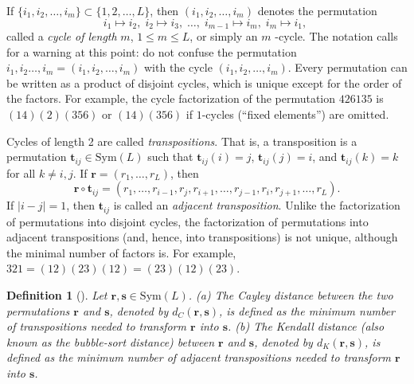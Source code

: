 \documentclass{article}
\newtheorem{definition}[theorem]{Definition}
\begin{document}
If $\{i_{1},i_{2},\ldots,i_{m}\}\subset \{1,2,\ldots,L\}$, then $%
(i_{1},i_{2},\ldots, i_{m})$ denotes the permutation%
\begin{equation}
i_{1}\mapsto i_{2},\;i_{2}\mapsto i_{3},\;\ldots,\;i_{m-1}\mapsto
i_{m},\;i_{m}\mapsto i_{1},\;  \label{cycle}
\end{equation}%
called a \textit{cycle of length} $m$, $1\leq m\leq L$, or simply an $m$%
-cycle. The notation calls for a warning at this point: do not confuse the
permutation $i_{1},i_{2}\ldots, i_{m}=(i_{1},i_{2},\ldots,i_{m})$ with the cycle $%
(i_{1},i_{2},\ldots,i_{m})$. Every permutation can be written as a product of
disjoint cycles, which is unique except for the order of the factors. For
example, the cycle factorization of the permutation $426135$ is $%
(14)(2)(356) $ or $(14)(356)$ if $1$-cycles (``fixed
elements'') are omitted.

Cycles of length 2 are called \textit{transpositions}. That is, a
transposition is a permutation $\mathbf{t}_{ij}\in \mathrm{Sym}(L)$ such
that $\mathbf{t}_{ij}(i)=j$, $\mathbf{t}_{ij}(j)=i$, and $\mathbf{t}%
_{ij}(k)=k$ for all $k\neq i,j$. If $\mathbf{r}=(r_{1},\ldots,r_{L})$, then%
\begin{equation}
\mathbf{r\circ t}%
_{ij}=(r_{1},\ldots,r_{i-1},r_{j},r_{i+1},\ldots,r_{j-1},r_{i},r_{j+1},\ldots,r_{L}).
\label{transposition}
\end{equation}%
If $\left\vert i-j\right\vert =1$, then $\mathbf{t}_{ij}$ is called an 
\textit{adjacent transposition}. Unlike the factorization of permutations into disjoint cycles, the factorization of permutations into adjacent transpositions (and, hence, into transpositions) is not unique, although the minimal number of factors is. For example, $321 = (12)(23)(12) = (23)(12)(23)$.

\begin{definition}[\cite{Nguyen2024,Kendall1938}]\label{DefDistances}
 Let $\mathbf{r},\mathbf{s}%
\in \mathrm{Sym}(L)$. (a) The \emph{Cayley distance} between the two
permutations $\mathbf{r}$ and $\mathbf{s}$, denoted by $d_{C}(\mathbf{r},%
\mathbf{s})$, is defined as the minimum number of transpositions needed to
transform $\mathbf{r}$ into $\mathbf{s}$. (b) The \emph{Kendall distance}
(also known as the bubble-sort distance) between $\mathbf{r}$ and $\mathbf{s}
$, denoted by $d_{K}(\mathbf{r},\mathbf{s})$, is defined as the minimum
number of \emph{adjacent} transpositions needed to transform $\mathbf{r}$
into $\mathbf{s}$.
\end{definition}
\end{document}

